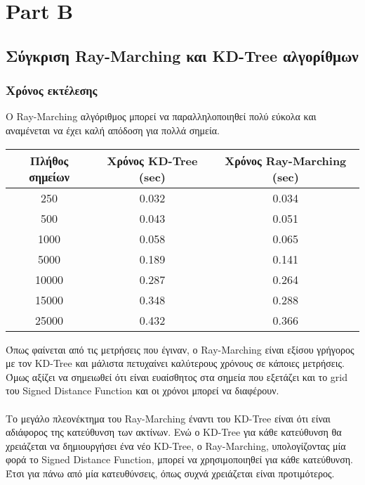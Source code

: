 \documentclass{report}
\begin{document}
\chapter{Part B}

\section{Σύγκριση Ray-Marching και KD-Tree αλγορίθμων}
\subsection{Χρόνος εκτέλεσης}
Ο Ray-Marching αλγόριθμος μπορεί να παραλληλοποιηθεί πολύ εύκολα και αναμένεται να έχει καλή απόδοση για πολλά σημεία.

\begin{table}[H]
    \centering
    \begin{tabular}{c||c c}
        Πλήθος σημείων & Χρόνος KD-Tree (sec) & Xρόνος Ray-Marching (sec) \\
        \hline
        250 & 0.032 & 0.034\\
        500 & 0.043 & 0.051\\
        1000 & 0.058 & 0.065\\
        5000 & 0.189 & 0.141\\
        10000 & 0.287 & 0.264\\
        15000 & 0.348 & 0.288\\
        25000 & 0.432 & 0.366\\
    \end{tabular} 
\end{table}
Όπως φαίνεται από τις μετρήσεις που έγιναν, ο Ray-Marching είναι εξίσου γρήγορος με τον KD-Tree και μάλιστα
πετυχαίνει καλύτερους χρόνους σε κάποιες μετρήσεις. Όμως αξίζει να σημειωθεί ότι είναι ευαίσθητος στα σημεία που εξετάζει
και το grid του Signed Distance Function και οι χρόνοι μπορεί να διαφέρουν.
\\\\
Το μεγάλο πλεονέκτημα του Ray-Marching έναντι του KD-Tree είναι ότι είναι αδιάφορος της κατεύθυνση των ακτίνων. Ενώ ο
KD-Tree για κάθε κατεύθυνση θα χρειάζεται να δημιουργήσει ένα νέο KD-Tree, ο Ray-Marching, υπολογίζοντας μία φορά το
Signed Distance Function, μπορεί να χρησιμοποιηθεί για κάθε κατεύθυνση. Έτσι για πάνω από μία κατευθύνσεις, όπως συχνά χρειάζεται
είναι προτιμότερος.
\end{document}
